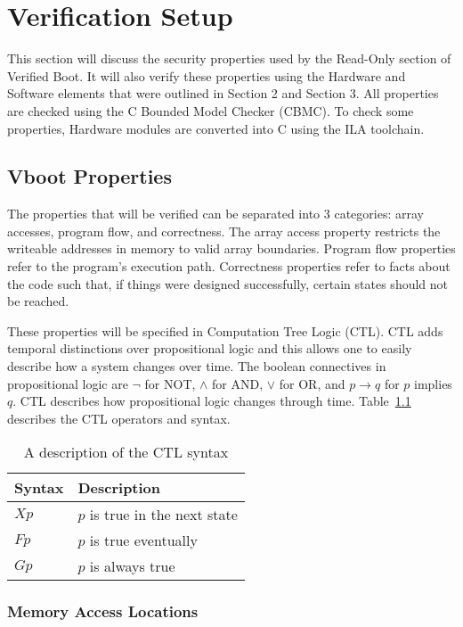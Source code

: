 \chapter{Verification Setup}\label{sec:Verif}

This section will discuss the security properties used by the Read-Only
section of Verified Boot. 
It will also verify these properties using the Hardware and
Software elements that were outlined in Section 2 and Section 3.
All properties are checked using the C Bounded Model Checker (CBMC).
To check some properties, Hardware modules are converted into C using the ILA toolchain.

\section{Vboot Properties}

The properties that will be verified can be separated into 3 categories: array accesses, program flow, and correctness.
The array access property restricts the writeable addresses in memory to valid array boundaries. 
Program flow properties refer to the program's execution path.
Correctness properties refer to facts about the code such that, if things were
designed successfully, certain states should not be reached.

These properties will be specified in Computation Tree Logic (CTL). 
CTL adds temporal distinctions over propositional logic and this allows one to easily describe how a system changes over time.
The boolean connectives in propositional logic are $\lnot$ for NOT, $\land$ for
AND, $\lor$ for OR, and $p \to q$ for $p$ implies $q$.
CTL describes how propositional logic changes through time.
Table~\ref{ctl_syn} describes the CTL operators and syntax.

\begin{table}[!htbp]
    \centering
    \caption{A description of the CTL syntax}\label{ctl_syn}
    \begin{tabular}{ll}
        \toprule Syntax & Description  \\ \midrule 
        $Xp$ & $p$ is true in the next state\\ 
        $Fp$ & $p$ is true eventually\\ 
        $Gp$ & $p$ is always true\\ \bottomrule
    \end{tabular}
\end{table}

\subsection{Memory Access Locations}\label{my-malloc}

